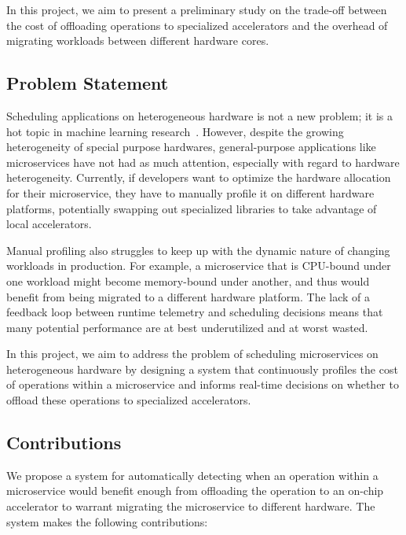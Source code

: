 In this project, we aim to present a preliminary study on the trade-off between the cost of offloading operations to specialized accelerators and the overhead of migrating workloads between different hardware cores.

\subsection{Problem Statement}

Scheduling applications on heterogeneous hardware is not a new problem; it is a hot topic in machine learning research~\cite{narayanan2023hetero,subramanya2023sia}.
However, despite the growing heterogeneity of special purpose hardwares, general-purpose applications like microservices have not had as much attention, especially with regard to hardware heterogeneity.
Currently, if developers want to optimize the hardware allocation for their microservice, they have to manually profile it on different hardware platforms, potentially swapping out specialized libraries to take advantage of local accelerators.

Manual profiling also struggles to keep up with the dynamic nature of changing workloads in production.
For example, a microservice that is CPU-bound under one workload might become memory-bound under another, and thus would benefit from being migrated to a different hardware platform.
The lack of a feedback loop between runtime telemetry and scheduling decisions means that many potential performance are at best underutilized and at worst wasted.

In this project, we aim to address the problem of scheduling microservices on heterogeneous hardware by designing a system that continuously profiles the cost of operations within a microservice and informs real-time decisions on whether to offload these operations to specialized accelerators.

\subsection{Contributions}

We propose a system for automatically detecting when an operation within a microservice would benefit enough from offloading the operation to an on-chip accelerator to warrant migrating the microservice to different hardware.
The system makes the following contributions:


